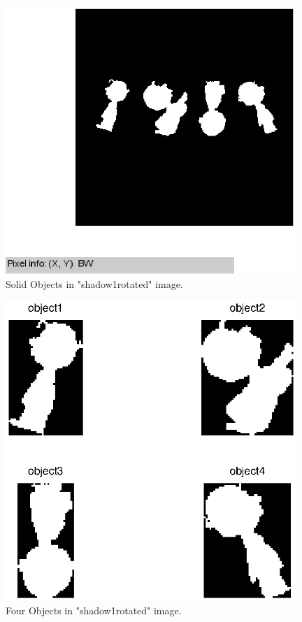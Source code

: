 \documentclass[paper=a4, fontsize=11pt]{scrartcl}
\begin{document}
\begin{figure}
	\centering
	\includegraphics[width=11cm]{shadow1rotated_solidpart.eps}
	\caption{ Solid Objects in "shadow1rotated" image. }
	\label{fig:26}
\end{figure}





\begin{figure}
	\centering
	\includegraphics[width=11cm]{4objectinshadowrotated1.eps}
	\caption{ Four Objects in "shadow1rotated" image. }
	\label{fig:27}
\end{figure}
\end{document}
